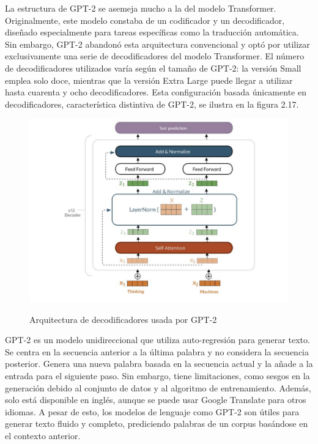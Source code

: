La estructura de GPT-2 se asemeja mucho a la del modelo Transformer. Originalmente, este modelo constaba de un codificador y un decodificador, diseñado especialmente para tareas específicas como la traducción automática. Sin embargo, GPT-2 abandonó esta arquitectura convencional y optó por utilizar exclusivamente una serie de decodificadores del modelo Transformer. El número de decodificadores utilizados varía según el tamaño de GPT-2: la versión Small emplea solo doce, mientras que la versión Extra Large puede llegar a utilizar hasta cuarenta y ocho decodificadores. Esta configuración basada únicamente en decodificadores, característica distintiva de GPT-2, se ilustra en la figura 2.17.

\begin{figure}[h]
	\centering
	\includegraphics[scale=0.5]{Imagenes/gpt2_architecture}
	\caption{Arquitectura de decodificadores usada por GPT-2} \cite{cristinaalameda}
	\label{fig:gpt2_architecture}
\end{figure}

GPT-2 es un modelo unidireccional que utiliza auto-regresión para generar texto. Se centra en la secuencia anterior a la última palabra y no considera la secuencia posterior. Genera una nueva palabra basada en la secuencia actual y la añade a la entrada para el siguiente paso. Sin embargo, tiene limitaciones, como sesgos en la generación debido al conjunto de datos y al algoritmo de entrenamiento. Además, solo está disponible en inglés, aunque se puede usar Google Translate para otros idiomas. A pesar de esto, los modelos de lenguaje como GPT-2 son útiles para generar texto fluido y completo, prediciendo palabras de un corpus basándose en el contexto anterior.
 

